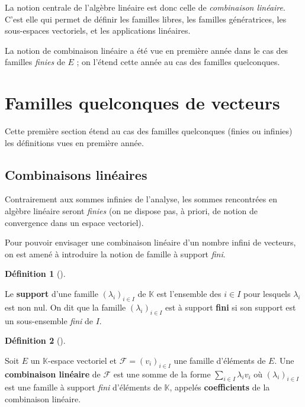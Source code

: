\documentclass[
  french,
  letterpaper,
  DIV=11,
  numbers=noendperiod]{scrreprt}
\theoremstyle{plain}
\theoremstyle{definition}
\newtheorem{definition}{Définition}[chapter]
\theoremstyle{plain}
\theoremstyle{plain}
\theoremstyle{definition}
\theoremstyle{definition}
\theoremstyle{plain}
\theoremstyle{remark}
\begin{document}
La notion centrale de l'algèbre linéaire est donc celle de
\emph{combinaison linéaire}. C'est elle qui permet de définir les
familles libres, les familles génératrices, les sous-espaces vectoriels,
et les applications linéaires.

La notion de combinaison linéaire a été vue en première année dans le
cas des familles \emph{finies} de \(E\) ; on l'étend cette année au cas
des familles quelconques.

\section{Familles quelconques de
vecteurs}\label{sec-03-familles-quelconques-de-vecteurs}

Cette première section étend au cas des familles quelconques (finies ou
infinies) les définitions vues en première année.

\subsection{Combinaisons linéaires}\label{combinaisons-linuxe9aires}

Contrairement aux sommes infinies de l'analyse, les sommes rencontrées
en algèbre linéaire seront \emph{finies} (on ne dispose pas, à priori,
de notion de convergence dans un espace vectoriel).

Pour pouvoir envisager une combinaison linéaire d'un nombre infini de
vecteurs, on est amené à introduire la notion de famille à support
\emph{fini}.

\begin{definition}[]\protect\hypertarget{def-support-fini}{}\label{def-support-fini}

Le \textbf{support} d'une famille \((\lambda_{i})_{i \in I}\) de
\(\mathbb{K}\) est l'ensemble des \(i \in I\) pour lesquels
\(\lambda_{i}\) est non nul. On dit que la famille
\((\lambda_{i})_{i \in I}\) est à support \textbf{fini} si son support
est un sous-ensemble \emph{fini} de \(I\).

\end{definition}

\begin{definition}[]\protect\hypertarget{def-combinaison-lineaire}{}\label{def-combinaison-lineaire}

Soit \(E\) un \(\mathbb{K}\)-espace vectoriel et
\(\mathcal{F}=(v_{i})_{i \in I}\) une famille d'éléments de \(E\). Une
\textbf{combinaison linéaire} de \(\mathcal{F}\) est une somme de la
forme \(\sum_{i \in I}\lambda_{i}v_{i}\) où \((\lambda_{i})_{i
\in I}\) est une famille à support \emph{fini} d'éléments de
\(\mathbb{K}\), appelés \textbf{coefficients} de la combinaison
linéaire.

\end{definition}
\end{document}
